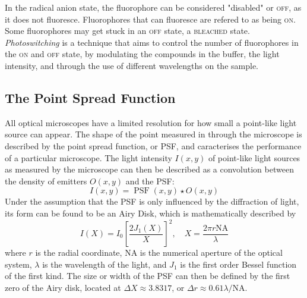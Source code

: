 In the radical anion state, the fluorophore can be considered "disabled" or \textsc{off}, as it does not fluoresce. Fluorophores that can fluoresce are refered to as being \textsc{on}. Some fluorophores may get stuck in an \textsc{off} state, a \textsc{bleached} state. \emph{Photoswitching} is a technique that aims to control the number of fluorophores in the \textsc{on} and \textsc{off} state, by modulating the compounds in the buffer, the light intensity, and through the use of different wavelengths on the sample. 


\subsection{The Point Spread Function} \label{sec:PSF}
All optical microscopes have a limited resolution for how small a point-like light source can appear. The shape of the point measured in through the microscope is described by the point spread function, or PSF, and caracterises the performance of a particular microscope. The light intensity $I(x, y)$ of point-like light sources as measured by the microscope can then be described as a convolution between the density of emitters $O(x, y)$ and the PSF:
\begin{equation}
    I(x, y) = \operatorname{PSF}(x, y) \star O(x, y)
\end{equation}
Under the assumption that the PSF is only influenced by the diffraction of light, its form can be found to be an Airy Disk, which is mathematically described by
\begin{equation}
    I(X) = I_0 \left[ \frac{2 J_1(X)}{X} \right]^{2}, \quad X = \frac{2\pi r \textrm{NA}}{\lambda}
\end{equation}
where $r$ is the radial coordinate, NA is the numerical aperture of the optical system, $\lambda$ is the wavelength of the light, and $J_1$ is the first order Bessel function of the first kind. The size or width of the PSF can then be defined by the first zero of the Airy disk, located at $\Delta X \approx 3.8317$, or $\Delta r \approx 0.61 \lambda / \textrm{NA}$.

